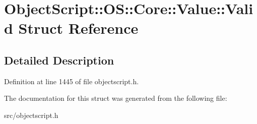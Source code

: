 \hypertarget{struct_object_script_1_1_o_s_1_1_core_1_1_value_1_1_valid}{}\section{Object\+Script\+:\+:OS\+:\+:Core\+:\+:Value\+:\+:Valid Struct Reference}
\label{struct_object_script_1_1_o_s_1_1_core_1_1_value_1_1_valid}


\subsection{Detailed Description}


Definition at line 1445 of file objectscript.\+h.



The documentation for this struct was generated from the following file\+:\begin{DoxyCompactItemize}
\item 
src/objectscript.\+h\end{DoxyCompactItemize}
